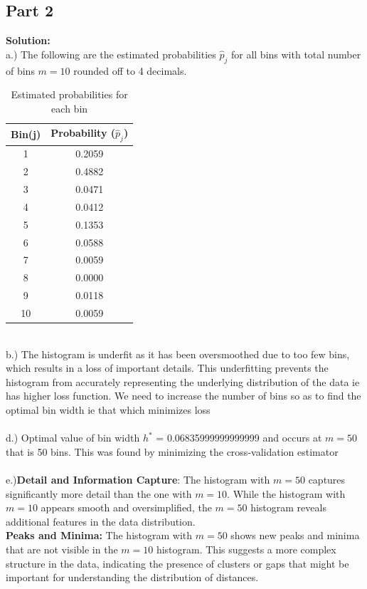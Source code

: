 \documentclass[12pt]{article}
\begin{document}
\subsection{Part 2}
\textbf{Solution: } \\
a.) The following are the estimated probabilities $\hat{p}_{j}$ for all bins with total number of bins $m=10$ rounded off to 4 decimals.
\begin{table}[h]
    \centering
    \begin{tabular}{@{}cc@{}}
        \toprule
        \textbf{Bin(j)} & \textbf{Probability ($\hat{p}_j$)} \\ \midrule
        1  & 0.2059 \\
        2  & 0.4882 \\
        3  & 0.0471 \\
        4  & 0.0412 \\
        5  & 0.1353 \\
        6  & 0.0588 \\
        7  & 0.0059 \\
        8  & 0.0000 \\
        9  & 0.0118 \\
        10 & 0.0059 \\ \bottomrule
    \end{tabular}
    \caption{Estimated probabilities for each bin}
    \label{tab:probabilities}
\end{table} \\
b.) The histogram is underfit as it has been oversmoothed due to too few bins,
which results in a loss of important details. This underfitting prevents the histogram from 
accurately representing the underlying distribution of the data ie has higher loss function. We need to increase the number of bins
so as to find the optimal bin width ie that which minimizes loss \\
\\
d.) Optimal value of bin width $h^*$ =  0.06835999999999999 and occurs at $m=50$ that is 50 bins.
This was found by minimizing the cross-validation estimator \\
\\
e.)\textbf{Detail and Information Capture}: The histogram with $m=50$ captures significantly more detail than the one with 
$m=10$. While the histogram with $m=10$ appears smooth and oversimplified, the $m=50$ histogram reveals additional features in the data distribution.
\\
\textbf{Peaks and Minima:} The histogram with \( m = 50 \) shows new peaks and minima that are not visible in the \( m = 10 \) histogram. This suggests a more complex structure in the data, indicating the presence of clusters or gaps that might be important for understanding the distribution of distances.
\end{document}

